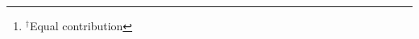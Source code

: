 \begin{abstract}
    We propose a method for transferring rigid motion from a driving video to a
    target image.
        {\let\thefootnote\relax\footnote{{$^{\dagger}$Equal contribution}}}
\end{abstract}